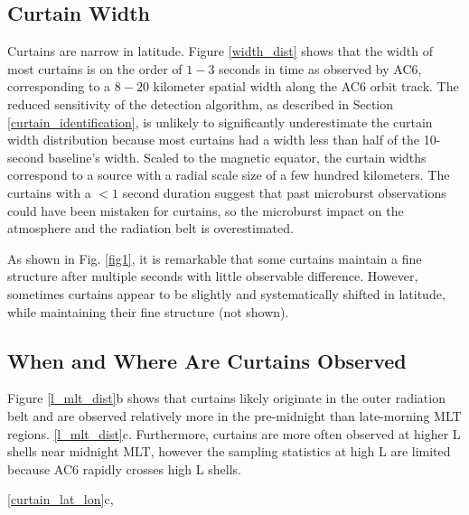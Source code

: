\documentclass[draft]{agujournal2019}
\begin{document}
\subsection{Curtain Width}
Curtains are narrow in latitude. Figure \ref{width_dist} shows that the width of most curtains is on the order of $1-3$ seconds in time as observed by AC6, corresponding to a $8-20$ kilometer spatial width along the AC6 orbit track. The reduced sensitivity of the detection algorithm, as described in Section \ref{curtain_identification}, is unlikely to significantly underestimate the curtain width distribution because most curtains had a width less than half of the 10-second baseline's width. Scaled to the magnetic equator, the curtain widths correspond to a source with a radial scale size of a few hundred kilometers. The curtains with a $< 1$ second duration suggest that past microburst observations could have been mistaken for curtains, so the microburst impact on the atmosphere and the radiation belt is overestimated.

As shown in Fig. \ref{fig1}, it is remarkable that some curtains maintain a fine structure after multiple seconds with little observable difference. However, sometimes curtains appear to be slightly and systematically shifted in latitude, while maintaining their fine structure (not shown).

\subsection{When and Where Are Curtains Observed}
Figure \ref{l_mlt_dist}b shows that curtains likely originate in the outer radiation belt  and are observed relatively more in the pre-midnight than late-morning MLT regions.  \ref{l_mlt_dist}c. Furthermore, curtains are more often observed at higher L shells near midnight MLT, however the sampling statistics at high L are limited because AC6 rapidly crosses high L shells.  

 \ref{curtain_lat_lon}c, 
\end{document}

